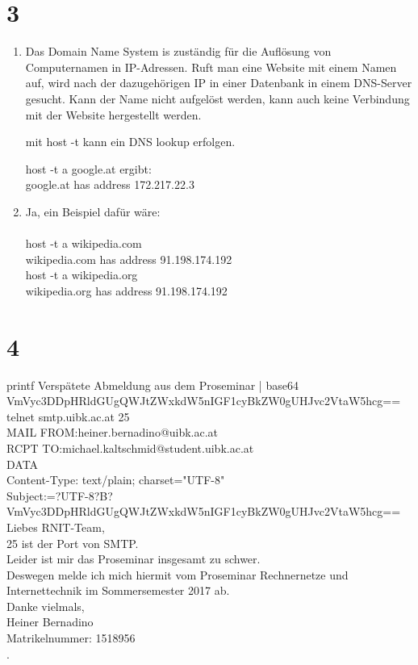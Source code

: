\documentclass[ngerman]{scrartcl}
\begin{document}
\section*{3}
	\begin{enumerate}[label=\alph*)]
	\item 
	  Das Domain Name System is zuständig für die Auflösung von Computernamen in IP-Adressen.
	  Ruft man eine Website mit einem Namen auf, wird nach der dazugehörigen IP in einer Datenbank 
	  in einem DNS-Server gesucht. Kann der Name nicht aufgelöst werden, kann auch keine Verbindung 
	  mit der Website hergestellt werden.
	  
	  mit host -t kann ein DNS lookup erfolgen.
	  
	  host -t a google.at ergibt: \\
	  google.at has address 172.217.22.3
	 \item 
	  Ja, ein Beispiel dafür wäre: \\
	  \\
	  host -t a wikipedia.com \\
	  wikipedia.com has address 91.198.174.192 \\
	  host -t a wikipedia.org \\
	  wikipedia.org has address 91.198.174.192 \\
	  
	\end{enumerate}
\pagebreak	  
\section*{4}
	 printf Verspätete Abmeldung aus dem Proseminar | base64 \\
	 VmVyc3DDpHRldGUgQWJtZWxkdW5nIGF1cyBkZW0gUHJvc2VtaW5hcg== \\
	 
	 telnet smtp.uibk.ac.at 25 \\
	 
	 MAIL FROM:heiner.bernadino@uibk.ac.at \\
	 RCPT TO:michael.kaltschmid@student.uibk.ac.at \\
	 DATA \\
	 Content-Type: text/plain; charset="UTF-8" \\
	 Subject:=?UTF-8?B?VmVyc3DDpHRldGUgQWJtZWxkdW5nIGF1cyBkZW0gUHJvc2VtaW5hcg== \\
	 Liebes RNIT-Team, \\
	 25 ist der Port von SMTP. \\
	 Leider ist mir das Proseminar insgesamt zu schwer. \\
	 Deswegen melde ich mich hiermit vom Proseminar Rechnernetze und \\
	 Internettechnik im Sommersemester 2017 ab. \\
	 Danke vielmals, \\
	 Heiner Bernadino \\
	 Matrikelnummer: 1518956 \\ 
	 .	  
\end{document}
